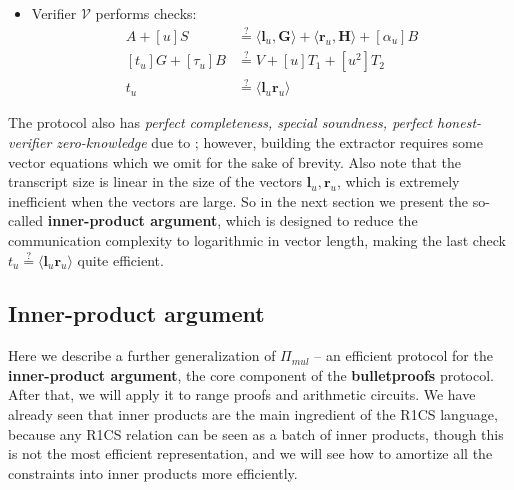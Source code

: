 \documentclass[../lecture-notes-148x210.tex]{subfiles}
\begin{document}
\begin{definition}
\begin{itemize}
\begin{equation}
            \end{equation}
            and sends $(\mathbf{l}_u, \mathbf{r}_u, t_u, \alpha_u, \tau_u)$ to $\mathcal{V}$.
        \item Verifier $\mathcal{V}$ performs checks: 
            \begin{equation}
                \begin{aligned}
                    A + [u]S &\stackrel{\text{?}}{=} \langle \mathbf{l}_u, \mathbf{G} \rangle + \langle \mathbf{r}_u, \mathbf{H} \rangle + [\alpha_u]B \\
                    [t_u]G + [\tau_u]B &\stackrel{\text{?}}{=} V + [u]T_1 + [u^2]T_2 \\
                    t_u &\stackrel{\text{?}}{=} \langle \mathbf{l}_u \mathbf{r}_u \rangle
                \end{aligned}
            \end{equation}
    \end{itemize}
\end{definition}

The protocol also has \textit{perfect completeness, special soundness, perfect honest-verifier zero-knowledge} due to ; however, building the extractor requires some vector equations which we omit for the sake of brevity. Also note that the transcript size is linear in the size of the vectors $\mathbf{l}_u, \mathbf{r}_u$, which is extremely inefficient when the vectors are large. So in the next section we present the so-called \textbf{inner-product argument}, which is designed to reduce the communication complexity to logarithmic in vector length, making the last check $t_u \stackrel{\text{?}}{=} \langle \mathbf{l}_u \mathbf{r}_u \rangle$ quite efficient.

\subsection{Inner-product argument}

Here we describe a further generalization of $\Pi_{mul}$ -- an efficient protocol for the \textbf{inner-product argument}, the core component of the \textbf{bulletproofs} protocol. After that, we will apply it to range proofs and arithmetic circuits. We have already seen that inner products are the main ingredient of the R1CS language, because any R1CS relation can be seen as a batch of inner products, though this is not the most efficient representation, and we will see how to amortize all the constraints into inner products more efficiently.
\end{document}
